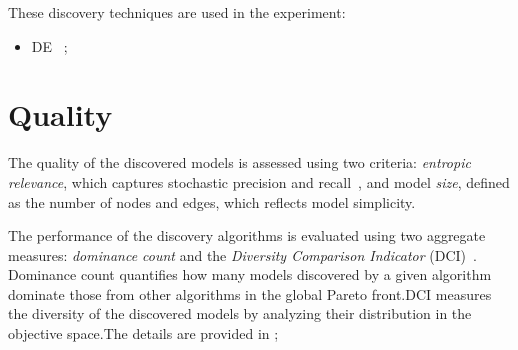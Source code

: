\documentclass{article}
\begin{document}
These discovery techniques are used in the experiment:
\begin{itemize}
\item DE ~\cite{DE};
\end{itemize}
\section{Quality}
\label{sec:quality}
The quality of the discovered models is assessed using two criteria: \emph{entropic relevance}, which captures stochastic precision and recall~\cite{AlkhammashPMG22}, and model \emph{size}, defined as the number of nodes and edges, which reflects model simplicity.

The performance of the discovery algorithms is evaluated using two aggregate measures: \emph{dominance count} and the \emph{Diversity Comparison Indicator} (DCI)~\cite{LiYL14}.
Dominance count quantifies how many models discovered by a given algorithm dominate those from other algorithms in the global Pareto front.DCI measures the diversity of the discovered models by analyzing their distribution in the objective space.The details are provided in \cite{zhian2025}; 
\end{document}
